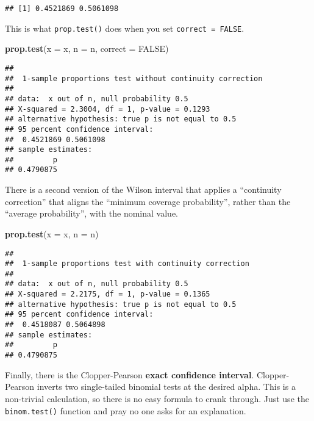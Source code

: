 \documentclass[
]{book}
\newenvironment{Shaded}{\begin{snugshade}}{\end{snugshade}}
\newcommand{\DataTypeTok}[1]{\textcolor[rgb]{0.13,0.29,0.53}{#1}}
\newcommand{\KeywordTok}[1]{\textcolor[rgb]{0.13,0.29,0.53}{\textbf{#1}}}
\newcommand{\NormalTok}[1]{#1}
\newcommand{\OtherTok}[1]{\textcolor[rgb]{0.56,0.35,0.01}{#1}}
\begin{document}
\begin{verbatim}
## [1] 0.4521869 0.5061098
\end{verbatim}

This is what \texttt{prop.test()} does when you set \texttt{correct\ =\ FALSE}.

\begin{Shaded}
\begin{Highlighting}[]
\KeywordTok{prop.test}\NormalTok{(}\DataTypeTok{x =}\NormalTok{ x, }\DataTypeTok{n =}\NormalTok{ n, }\DataTypeTok{correct =} \OtherTok{FALSE}\NormalTok{)}
\end{Highlighting}
\end{Shaded}

\begin{verbatim}
## 
##  1-sample proportions test without continuity correction
## 
## data:  x out of n, null probability 0.5
## X-squared = 2.3004, df = 1, p-value = 0.1293
## alternative hypothesis: true p is not equal to 0.5
## 95 percent confidence interval:
##  0.4521869 0.5061098
## sample estimates:
##         p 
## 0.4790875
\end{verbatim}

There is a second version of the Wilson interval that applies a ``continuity correction'' that aligns the ``minimum coverage probability'', rather than the ``average probability'', with the nominal value.

\begin{Shaded}
\begin{Highlighting}[]
\KeywordTok{prop.test}\NormalTok{(}\DataTypeTok{x =}\NormalTok{ x, }\DataTypeTok{n =}\NormalTok{ n)}
\end{Highlighting}
\end{Shaded}

\begin{verbatim}
## 
##  1-sample proportions test with continuity correction
## 
## data:  x out of n, null probability 0.5
## X-squared = 2.2175, df = 1, p-value = 0.1365
## alternative hypothesis: true p is not equal to 0.5
## 95 percent confidence interval:
##  0.4518087 0.5064898
## sample estimates:
##         p 
## 0.4790875
\end{verbatim}

Finally, there is the Clopper-Pearson \textbf{exact confidence interval}. Clopper-Pearson inverts two single-tailed binomial tests at the desired alpha. This is a non-trivial calculation, so there is no easy formula to crank through. Just use the \texttt{binom.test()} function and pray no one asks for an explanation.
\end{document}

